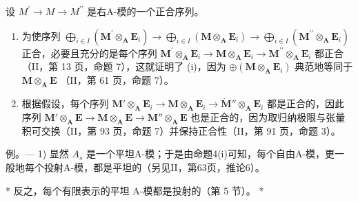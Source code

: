 设 \(M^{\prime} \rightarrow M \rightarrow M^{\prime\prime}\) 是右A-模的一个正合序列。

\begin{enumerate}
\def\labelenumi{(\roman{enumi})}
\item
  为使序列 \(\bigoplus_{i\in I}(\mathbf{M}^{\prime}\otimes_{\mathbf{A}}\mathbf{E}_{i})\to \bigoplus_{i\in I}(\mathbf{M}\otimes_{\mathbf{A}}\mathbf{E}_{i})\to \bigoplus_{i\in I}(\mathbf{M}^{\prime \prime}\otimes_{\mathbf{A}}\mathbf{E}_{i})\) 正合，必要且充分的是每个序列 \(\mathbf{M}^{\prime}\otimes_{\mathbf{A}}\mathbf{E}_{i}\to \mathbf{M}\otimes_{\mathbf{A}}\mathbf{E}_{i}\to \mathbf{M}^{\prime \prime}\otimes_{\mathbf{A}}\mathbf{E}_{i}\) 都正合（II，第 13 页，命题 7），这就证明了 (i)，因为 \(\oplus (\mathbf{M}\otimes_{\mathbf{A}}\mathbf{E}_{i})\) 典范地等同于 \(\mathbf{M}\otimes_{\mathbf{A}}\mathbf{E}\) （II，第 61 页，命题 7）。
\item
  根据假设，每个序列 \(\mathbf{M}' \otimes_{\mathbf{A}} \mathbf{E}_i \to \mathbf{M} \otimes_{\mathbf{A}} \mathbf{E}_i \to \dot{\mathbf{M}}'' \otimes_{\mathbf{A}} \mathbf{E}_i\) 都是正合的，因此序列 \(\mathbf{M}' \otimes_{\mathbf{A}} \mathbf{E} \to \mathbf{M} \otimes_{\mathbf{A}} \mathbf{E} \to \mathbf{M}'' \otimes_{\mathbf{A}} \mathbf{E}\) 也是正合的，因为取归纳极限与张量积可交换（II，第 93 页，命题 7）并保持正合性（II，第 91 页，命题 3）。
\end{enumerate}

例。--- 1) 显然 \(A_{s}\) 是一个平坦A-模；于是由命题4(i)可知，每个自由A-模，更一般地每个投射A-模，都是平坦的（另见II，第63页，推论6）。

* 反之，每个有限表示的平坦 A-模都是投射的（第 5 节）。 *

